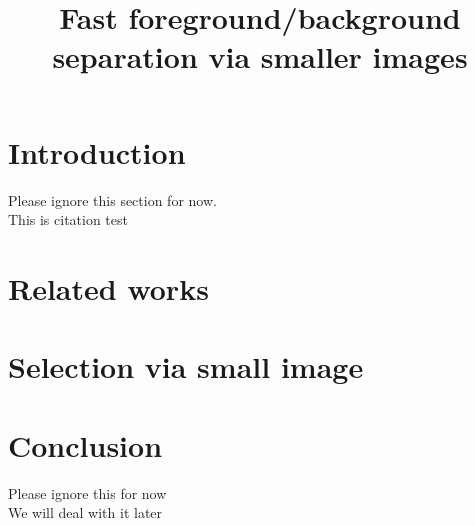 \documentclass{article}
\title{Fast foreground/background separation via smaller images}
\begin{document}
\maketitle

\section{Introduction}
Please ignore this section for now. \\
This is citation test \cite{DBLP:conf/caip/AmengualBR15,DBLP:conf/icinco/BoschCRF12}

\section{Related works}


\section{Selection via small image}


\section{Conclusion}
Please ignore this for now \\
We will deal with it later


\nocite{*}



\end{document}
